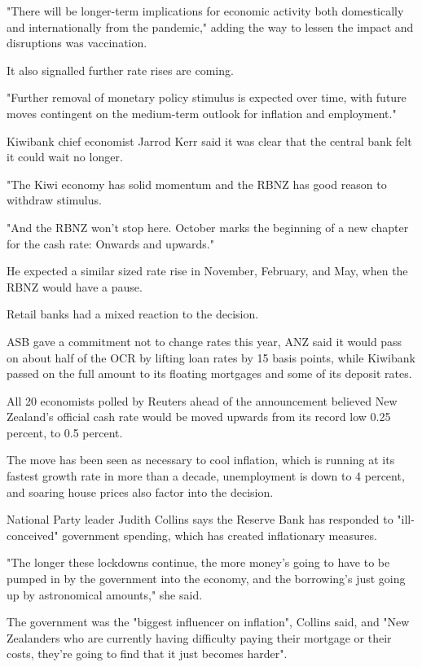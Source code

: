 \documentclass[a4paper,12pt]{article}
\begin{document}
{"There will be longer-term implications for economic activity both domestically and internationally from the pandemic," adding the way to lessen the impact and disruptions was vaccination.

It also signalled further rate rises are coming.

"Further removal of monetary policy stimulus is expected over time, with future moves contingent on the medium-term outlook for inflation and employment."

Kiwibank chief economist Jarrod Kerr said it was clear that the central bank felt it could wait no longer.

"The Kiwi economy has solid momentum and the RBNZ has good reason to withdraw stimulus.

"And the RBNZ won't stop here. October marks the beginning of a new chapter for the cash rate: Onwards and upwards."

He expected a similar sized rate rise in November, February, and May, when the RBNZ would have a pause.

Retail banks had a mixed reaction to the decision.

ASB gave a commitment not to change rates this year, ANZ said it would pass on about half of the OCR by lifting loan rates by 15 basis points, while Kiwibank passed on the full amount to its floating mortgages and some of its deposit rates.

All 20 economists polled by Reuters ahead of the announcement believed New Zealand's official cash rate would be moved upwards from its record low 0.25 percent, to 0.5 percent.

The move has been seen as necessary to cool inflation, which is running at its fastest growth rate in more than a decade, unemployment is down to 4 percent, and soaring house prices also factor into the decision.

National Party leader Judith Collins says the Reserve Bank has responded to "ill-conceived" government spending, which has created inflationary measures.

"The longer these lockdowns continue, the more money's going to have to be pumped in by the government into the economy, and the borrowing's just going up by astronomical amounts," she said.

The government was the "biggest influencer on inflation", Collins said, and "New Zealanders who are currently having difficulty paying their mortgage or their costs, they're going to find that it just becomes harder".

}
\end{document}

